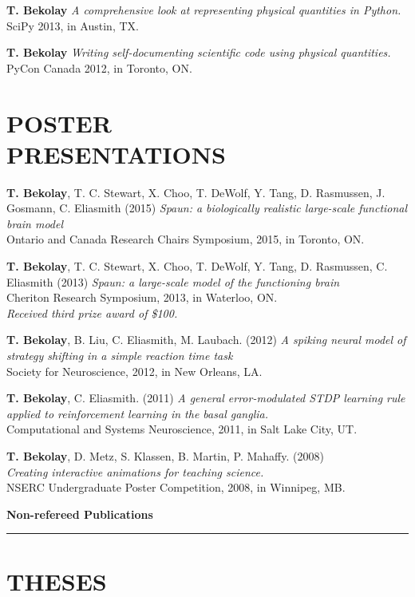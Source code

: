 \documentclass[line,margin]{res}
\begin{document}
\begin{resume}
\textbf{T. Bekolay}
  {\sl A comprehensive look at representing physical quantities in Python.}
  SciPy 2013, in Austin, TX.

\textbf{T. Bekolay}
  {\sl Writing self-documenting scientific code using physical quantities.}
  PyCon Canada 2012, in Toronto, ON.

\section{POSTER \\PRESENTATIONS}

\textbf{T. Bekolay}, T. C. Stewart, X. Choo, T. DeWolf, Y. Tang,
D. Rasmussen, J. Gosmann, C. Eliasmith (2015)
  {\sl Spaun: a biologically realistic large-scale functional brain model} \\
  Ontario and Canada Research Chairs Symposium, 2015, in Toronto, ON.

\textbf{T. Bekolay}, T. C. Stewart, X. Choo, T. DeWolf, Y. Tang,
D. Rasmussen, C. Eliasmith (2013)
  {\sl Spaun: a large-scale model of the functioning brain} \\
  Cheriton Research Symposium, 2013, in Waterloo, ON. \\
  {\sl Received third prize award of \$100.}

\textbf{T. Bekolay}, B. Liu, C. Eliasmith, M. Laubach. (2012)
  {\sl A spiking neural model of strategy shifting in a simple
  reaction time task} \\
  Society for Neuroscience, 2012, in New Orleans, LA.

\textbf{T. Bekolay}, C. Eliasmith. (2011)
  {\sl A general error-modulated STDP learning rule applied to
  reinforcement learning in the basal ganglia.} \\
  Computational and Systems Neuroscience, 2011, in Salt Lake City, UT.

\textbf{T. Bekolay}, D. Metz, S. Klassen, B. Martin, P. Mahaffy. (2008) \\
  {\sl Creating interactive animations for teaching science.} \\
  NSERC Undergraduate Poster Competition, 2008, in Winnipeg, MB.
  \vspace{0.42em}

{\Large \bf Non-refereed Publications} \\ \vspace{-8pt} \hrule

\section{THESES}


\end{resume}
\end{document}
